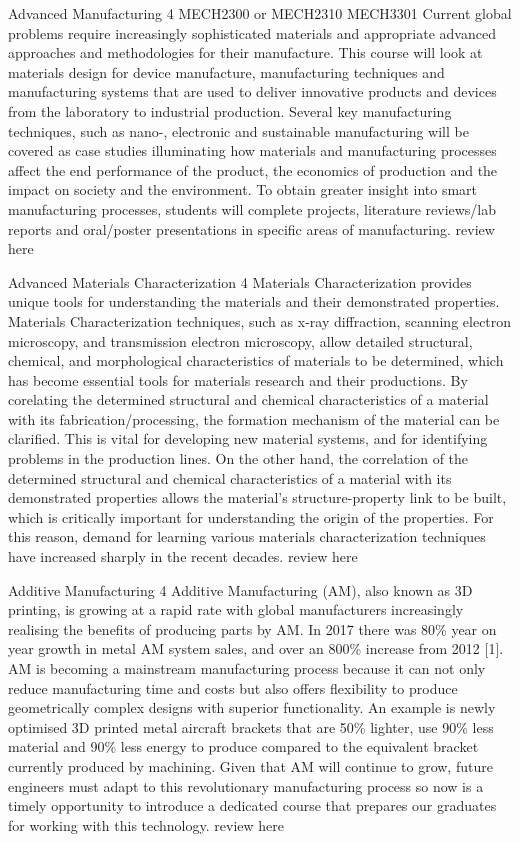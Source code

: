 	{Advanced Manufacturing}
	{4}
	{MECH2300 or MECH2310}
	{MECH3301}
	{}
	{Current global problems require increasingly sophisticated materials and appropriate advanced approaches and methodologies for their manufacture. This course will look at materials design for device manufacture, manufacturing techniques and manufacturing systems that are used to deliver innovative products and devices from the laboratory to industrial production. Several key manufacturing techniques, such as nano-, electronic and sustainable manufacturing will be covered as case studies illuminating how materials and manufacturing processes affect the end performance of the product, the economics of production and the impact on society and the environment. To obtain greater insight into smart manufacturing processes, students will complete projects, literature reviews/lab reports and oral/poster presentations in specific areas of manufacturing.}
	{review here}

	{Advanced Materials Characterization}
	{4}
	{}
	{}
	{}
	{Materials Characterization provides unique tools for understanding the materials and their demonstrated properties. Materials Characterization techniques, such as x-ray diffraction, scanning electron microscopy, and transmission electron microscopy, allow detailed structural, chemical, and morphological characteristics of materials to be determined, which has become essential tools for materials research and their productions. By corelating the determined structural and chemical characteristics of a material with its fabrication/processing, the formation mechanism of the material can be clarified. This is vital for developing new material systems, and for identifying problems in the production lines. On the other hand, the correlation of the determined structural and chemical characteristics of a material with its demonstrated properties allows the material's structure-property link to be built, which is critically important for understanding the origin of the properties. For this reason, demand for learning various materials characterization techniques have increased sharply in the recent decades.}
	{review here}

	{Additive Manufacturing}
	{4}
	{}
	{}
	{}
	{Additive Manufacturing (AM), also known as 3D printing, is growing at a rapid rate with global manufacturers increasingly realising the benefits of producing parts by AM. In 2017 there was 80\% year on year growth in metal AM system sales, and over an 800\% increase from 2012 [1]. AM is becoming a mainstream manufacturing process because it can not only reduce manufacturing time and costs but also offers flexibility to produce geometrically complex designs with superior functionality. An example is newly optimised 3D printed metal aircraft brackets that are 50\% lighter, use 90\% less material and 90\% less energy to produce compared to the equivalent bracket currently produced by machining. Given that AM will continue to grow, future engineers must adapt to this revolutionary manufacturing process so now is a timely opportunity to introduce a dedicated course that prepares our graduates for working with this technology.}
	{review here}

